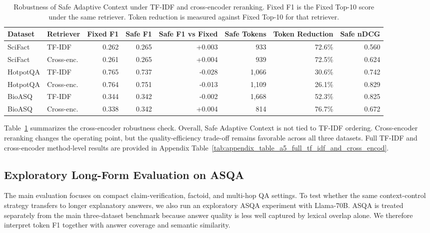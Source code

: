 \documentclass[11pt]{article}
\begin{document}
\begin{table}[t]
\centering
\small
\caption{Robustness of Safe Adaptive Context under TF-IDF and cross-encoder reranking. Fixed F1 is the Fixed Top-10 score under the same retriever. Token reduction is measured against Fixed Top-10 for that retriever.}
\label{tab:cross_encoder}

\begin{tabular}{llrrrrrr}
\toprule
Dataset & Retriever & Fixed F1 & Safe F1 & Safe F1 vs Fixed & Safe Tokens & Token Reduction & Safe nDCG \\
\midrule
SciFact & TF-IDF & 0.262 & 0.265 & +0.003 & 933 & 72.6\% & 0.560 \\
SciFact & Cross-enc. & 0.261 & 0.265 & +0.004 & 939 & 72.5\% & 0.624 \\
HotpotQA & TF-IDF & 0.765 & 0.737 & -0.028 & 1,066 & 30.6\% & 0.742 \\
HotpotQA & Cross-enc. & 0.764 & 0.751 & -0.013 & 1,109 & 26.1\% & 0.829 \\
BioASQ & TF-IDF & 0.344 & 0.342 & -0.002 & 1,668 & 52.3\% & 0.825 \\
BioASQ & Cross-enc. & 0.338 & 0.342 & +0.004 & 814 & 76.7\% & 0.672 \\
\bottomrule
\end{tabular}%
\end{table}

Table~\ref{tab:cross_encoder} summarizes the cross-encoder robustness check. Overall, Safe Adaptive Context is not tied to TF-IDF ordering. Cross-encoder reranking changes the operating point, but the quality-efficiency trade-off remains favorable across all three datasets. Full TF-IDF and cross-encoder method-level results are provided in Appendix Table~\ref{tab:appendix_table_a5_full_tf_idf_and_cross_encod}.


\subsection{Exploratory Long-Form Evaluation on ASQA}

The main evaluation focuses on compact claim-verification, factoid, and multi-hop QA settings. To test whether the same context-control strategy transfers to longer explanatory answers, we also run an exploratory ASQA experiment with Llama-70B. ASQA is treated separately from the main three-dataset benchmark because answer quality is less well captured by lexical overlap alone. We therefore interpret token F1 together with answer coverage and semantic similarity.
\end{document}
